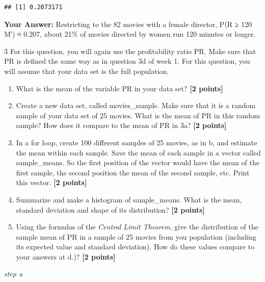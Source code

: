 \documentclass[
]{article}
\newenvironment{Shaded}{\begin{snugshade}}{\end{snugshade}}
\newcommand{\AttributeTok}[1]{\textcolor[rgb]{0.13,0.29,0.53}{#1}}
\newcommand{\ConstantTok}[1]{\textcolor[rgb]{0.56,0.35,0.01}{#1}}
\newcommand{\FunctionTok}[1]{\textcolor[rgb]{0.13,0.29,0.53}{\textbf{#1}}}
\newcommand{\NormalTok}[1]{#1}
\newcommand{\SpecialCharTok}[1]{\textcolor[rgb]{0.81,0.36,0.00}{\textbf{#1}}}
\providecommand{\tightlist}{%
  \setlength{\itemsep}{0pt}\setlength{\parskip}{0pt}}
\begin{document}
\begin{verbatim}
## [1] 0.2073171
\end{verbatim}

\textbf{Your Answer:} Restricting to the 82 movies with a female
director, P(R ≥ 120 \textbar{} M′) ≈ 0.207, about 21\% of movies
directed by women run 120 minutes or longer.

3 For this question, you will again use the profitability ratio PR. Make
sure that PR is defined the same way as in question 3d of week 1. For
this question, you will assume that your data set is the full
population.

\begin{enumerate}
\def\labelenumi{\alph{enumi}.}
\tightlist
\item
  What is the mean of the variable PR in your data set?
  \textbf{[2 points]}
\item
  Create a new data set, called movies\_sample. Make sure that it is a
  random sample of your data set of 25 movies. What is the mean of PR in
  this random sample? How does it compare to the mean of PR in 3a?
  \textbf{[2 points]}
\item
  In a for loop, create 100 different samples of 25 movies, as in b, and
  estimate the mean within each sample. Save the mean of each sample in
  a vector called sample\_means. So the first position of the vector
  would have the mean of the first sample, the second position the mean
  of the second sample, etc. Print this vector. \textbf{[2 points]}
\item
  Summarize and make a histogram of sample\_means. What is the mean,
  standard deviation and shape of its distribution? \textbf{[2 points]}
\item
  Using the formulas of the \emph{Central Limit Theorem}, give the
  distribution of the sample mean of PR in a sample of 25 movies from
  you population (including its expected value and standard deviation).
  How do these values compare to your answers at d.)?
  \textbf{[2 points]}
\end{enumerate}

\emph{step a}

\begin{Shaded}
\end{Shaded}
\end{document}

